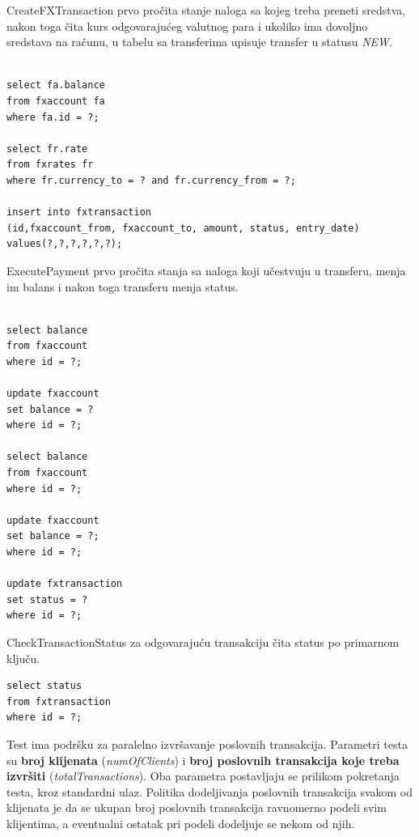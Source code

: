 \documentclass[12pt,oneside]{memoir}
\begin{document}
CreateFXTransaction prvo pročita stanje naloga sa kojeg treba preneti sredstva, nakon toga čita kurs odgovarajućeg valutnog para i ukoliko ima dovoljno sredstava na računu, u tabelu sa transferima upisuje transfer u statusu \textit{NEW}.

\pagebreak

\begin{lstlisting}[title={CreateFXTransaction},captionpos=b]

select fa.balance
from fxaccount fa
where fa.id = ?;

select fr.rate
from fxrates fr
where fr.currency_to = ? and fr.currency_from = ?;

insert into fxtransaction
(id,fxaccount_from, fxaccount_to, amount, status, entry_date)
values(?,?,?,?,?,?);
\end{lstlisting}

ExecutePayment prvo pročita stanja sa naloga koji učestvuju u transferu, menja im balans i nakon toga transferu menja status.

\begin{lstlisting}[title={ExecutePayment},captionpos=b]

select balance
from fxaccount
where id = ?;

update fxaccount
set balance = ?
where id = ?;

select balance
from fxaccount
where id = ?;

update fxaccount
set balance = ?;
where id = ?;

update fxtransaction
set status = ?
where id = ?;

\end{lstlisting}
\pagebreak
CheckTransactionStatus za odgovarajuću transakciju čita status po primarnom ključu.


\begin{lstlisting}[title={CheckTransactionStatus},captionpos=b]
select status
from fxtransaction
where id = ?;
\end{lstlisting}


Test ima podršku za paralelno izvršavanje poslovnih transakcija. Parametri testa su \textbf{broj klijenata} (\textit{numOfClients}) i \textbf{broj poslovnih transakcija koje treba izvršiti} (\textit{totalTransactions}). Oba parametra postavljaju se prilikom pokretanja testa, kroz standardni ulaz. Politika dodeljivanja poslovnih transakcija svakom od klijenata je da se ukupan broj poslovnih transakcija ravnomerno podeli svim klijentima, a eventualni ostatak pri podeli dodeljuje se nekom od njih.
\end{document}
